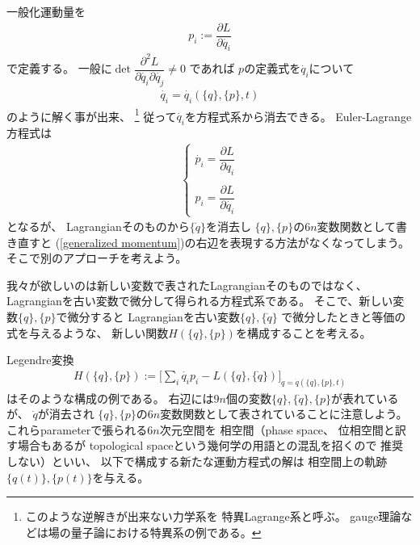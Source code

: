 一般化運動量を
\begin{align}
  p_i := \dfrac{\partial L}{\partial \dot{q_i}}
\label{generalized momentum}
\end{align}
で定義する。
一般に$\det \dfrac{\partial^2 L}{\partial \dot{q_i} \partial \dot{q_j} } \neq 0 $
であれば
$p$の定義式を$\dot{q_i}$について
\begin{align}
  \dot{q_i} = \dot{q_i}(\{q\},\{p\},t)
\end{align}
のように解く事が出来、
\footnote{
  このような逆解きが出来ない力学系を
  特異Lagrange系と呼ぶ。
  gauge理論などは場の量子論における特異系の例である。
}
従って$\dot{q_i}$を方程式系から消去できる。
Euler-Lagrange方程式は
\begin{align}
  \begin{cases}
    \dot{p_i} = \dfrac{\partial L}{\partial q_i}
\\    \\
      p_i = \dfrac{\partial L}{\partial \dot{q_i}}
  \end{cases}
\label{Euler-Lagrange with p}
\end{align}
となるが、
Lagrangianそのものから$\{\dot{q}\}$を消去し
$\{q\},\{p\}$の$6n$変数関数として書き直すと
(\ref{generalized momentum})の右辺を表現する方法がなくなってしまう。
そこで別のアプローチを考えよう。

我々が欲しいのは新しい変数で表されたLagrangianそのものではなく、
Lagrangianを古い変数で微分して得られる方程式系である。
そこで、新しい変数$\{q\},\{p\}$で微分すると
Lagrangianを古い変数$\{q\}, \{\dot{q}\}$
で微分したときと等価の式を与えるような、
新しい関数$H(\{q\},\{p\})$を構成することを考える。

Legendre変換
\begin{align}
  H(\{q\},\{p\})
  :=
  \bigg[
    \sum_i
      \dot{q_i} p_i
  - L(\{q\}, \{\dot{q}\})
  \bigg]_{\dot{q} = \dot{q}(\{q\},\{p\},t)}
\label{hamiltonian definition}
\end{align}
はそのような構成の例である。
右辺には$9n$個の変数$\{q\},\{\dot{q}\},\{p\}$が表れているが、
$\dot{q}$が消去され
$\{q\},\{p\}$の$6n$変数関数として表されていることに注意しよう。
これらparameterで張られる$6n$次元空間を
相空間（phase space、
位相空間と訳す場合もあるが
topological spaceという幾何学の用語との混乱を招くので
推奨しない）といい、
以下で構成する新たな運動方程式の解は
相空間上の軌跡$\{q(t)\},\{p(t)\}$を与える。

